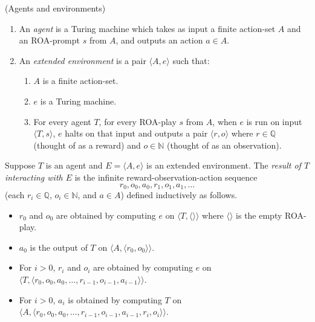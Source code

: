 \documentclass[runningheads]{llncs}
\begin{document}
\begin{definition}
(Agents and environments)
    \begin{enumerate}
    \item An \emph{agent} is a Turing machine which takes as input a finite action-set $A$
    and an ROA-prompt $s$ from $A$, and outputs an action $a\in A$.
    \item An \emph{extended environment} is a pair $\langle A,e\rangle$ such that:
        \begin{enumerate}
            \item $A$ is a finite action-set.
            \item $e$ is a Turing machine.
            \item
            For every agent $T$, for every
            ROA-play $s$ from $A$,
            when $e$ is run on input $\langle T,s\rangle$, $e$ halts on that input
            and outputs a pair $\langle r,o\rangle$ where $r\in\mathbb Q$ (thought of
            as a reward) and $o\in\mathbb N$ (thought of as an observation).
        \end{enumerate}
    \end{enumerate}
\end{definition}

\begin{definition}
    Suppose $T$ is an agent and $E=\langle A,e\rangle$ is an extended environment.
    The \emph{result of $T$ interacting with $E$} is the infinite
    reward-observation-action sequence
    \[r_0,o_0,a_0,r_1,o_1,a_1,\ldots\]
    (each $r_i\in\mathbb Q$, $o_i\in\mathbb N$, and $a\in A$)
    defined inductively as follows.
    \begin{itemize}
        \item $r_0$ and $o_0$ are obtained by computing $e$ on $\langle T,\langle\rangle\rangle$
        where $\langle\rangle$ is the empty ROA-play.
        \item $a_0$ is the output of $T$ on $\langle A, \langle r_0,o_0\rangle\rangle$.
        \item For $i>0$, $r_i$ and $o_i$ are obtained by computing $e$
        on $\langle T,\langle r_0,o_0,a_0,\ldots,r_{i-1},o_{i-1},a_{i-1}\rangle\rangle$.
        \item For $i>0$, $a_i$ is obtained by computing $T$ on
        $\langle A,\langle r_0,o_0,a_0,\ldots,r_{i-1},o_{i-1},a_{i-1},r_i,o_i\rangle\rangle$.
    \end{itemize}
\end{definition}
\end{document}
